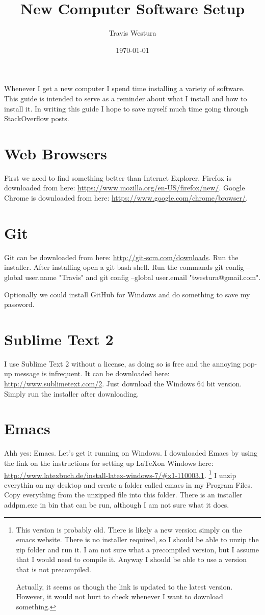 \documentclass{article}
\author{Travis Westura}
\title{New Computer Software Setup}
\date{\today}
\begin{document}
\maketitle

Whenever I get a new computer I spend time installing a variety of software.
This guide is intended to serve as a reminder about what I install and how to install it.
In writing this guide I hope to save myself much time going through StackOverflow posts.

\section{Web Browsers}

First we need to find something better than Internet Explorer.
Firefox is downloaded from here: \url{https://www.mozilla.org/en-US/firefox/new/}.
Google Chrome is downloaded from here: \url{https://www.google.com/chrome/browser/}.

\section{Git}
Git can be downloaded from here: \url{http://git-scm.com/downloads}.
Run the installer.
After installing open a git bash shell.
Run the commands git config --global user.name "Travis" and git config --global user.email "twestura@gmail.com".

Optionally we could install GitHub for Windows and do something to save my password.

\section{Sublime Text 2}
I use Sublime Text 2 without a license, as doing so is free and the annoying pop-up message is infrequent.
It can be downloaded here: \url{http://www.sublimetext.com/2}.
Just download the Windows 64 bit version.
Simply run the installer after downloading.

\section{Emacs}
Ahh yes: Emacs.
Let's get it running on Windows.
I downloaded Emacs by using the link on the instructions for setting up \LaTeX on Windows here:
	\url{http://www.latexbuch.de/install-latex-windows-7/#x1-110003.1}.
\footnote{
	This version is probably old.
	There is likely a new version simply on the emacs website.
	There is no installer required, so I should be able to unzip the zip folder and run it.
	I am not sure what a precompiled version, but I assume that I would need to compile it.
	Anyway I should be able to use a version that is not precompiled.

	Actually, it seems as though the link is updated to the latest version.
	However, it would not hurt to check whenever I want to download something.
}
I unzip everythin on my desktop and create a folder called emacs in my Program Files.
Copy everything from the unzipped file into this folder.
There is an installer addpm.exe in bin that can be run, although I am not sure what it does.
\end{document}
